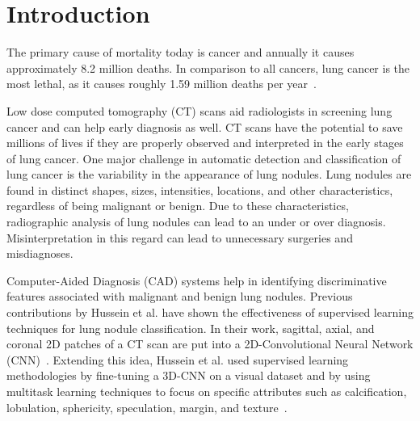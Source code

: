 \documentclass{article}
\begin{document}
\section{Introduction}
\label{sec:intro}
The primary cause of mortality today is cancer and annually it causes approximately 8.2 million deaths. In comparison to all cancers, lung cancer is the most lethal, as it causes roughly 1.59 million deaths per year~\cite{stewart2016world}.

Low dose computed tomography (CT) scans aid radiologists in screening lung cancer and can help early diagnosis as well. CT scans have the potential to save millions of lives if they are properly observed and interpreted in the early stages of lung cancer. One major challenge in automatic detection and classification of lung cancer is the variability in the appearance of lung nodules. Lung nodules are found in distinct shapes, sizes, intensities, locations, and other characteristics, regardless of being malignant or benign. Due to these characteristics, radiographic analysis of lung nodules can lead to an under or over diagnosis. Misinterpretation in this regard can lead to unnecessary surgeries and misdiagnoses. 
   
Computer-Aided Diagnosis (CAD) systems help in identifying discriminative features associated with malignant and benign lung nodules. Previous contributions by Hussein et al. have shown the effectiveness of supervised learning techniques for lung nodule classification. In their work, sagittal, axial, and coronal 2D patches of a CT scan are put into a 2D-Convolutional Neural Network (CNN)~\cite{hussein2017tumornet}. Extending this idea, Hussein et al. used supervised learning methodologies by fine-tuning a 3D-CNN on a visual dataset and by using multitask learning techniques to focus on specific attributes such as calcification, lobulation, sphericity, speculation, margin, and texture~\cite{hussein2017riskstratification}.
   
\end{document}
